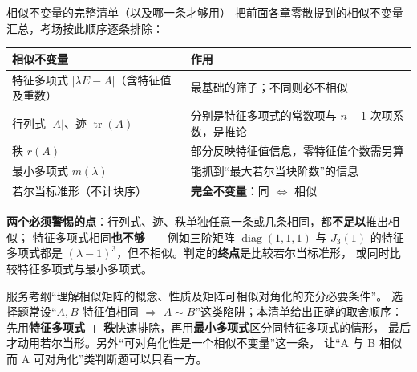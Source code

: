 
\begin{fdeep}{相似不变量的完整清单（以及哪一条才够用）}
把前面各章零散提到的相似不变量汇总，考场按此顺序逐条排除：
\begin{center}
\begin{tabular}{@{}ll@{}}
\textbf{相似不变量} & \textbf{作用} \\
\hline
特征多项式 $|\lambda E-A|$（含特征值及重数） & 最基础的筛子；不同则必不相似 \\
行列式 $|A|$、迹 $\operatorname{tr}(A)$ & 分别是特征多项式的常数项与 $n-1$ 次项系数，是推论 \\
秩 $r(A)$ & 部分反映特征值信息，零特征值个数需另算 \\
最小多项式 $m(\lambda)$ & 能抓到“最大若尔当块阶数”的信息 \\
若尔当标准形（不计块序） & \textbf{完全不变量}：同 $\iff$ 相似 \\
\end{tabular}
\end{center}
\textbf{两个必须警惕的点}：行列式、迹、秩单独任意一条或几条相同，都\textbf{不足以}推出相似；
特征多项式相同\textbf{也不够}——例如三阶矩阵 $\operatorname{diag}(1,1,1)$ 与 $J_3(1)$ 的特征
多项式都是 $(\lambda-1)^3$，但不相似。判定的\textbf{终点}是比较若尔当标准形，
或同时比较特征多项式与最小多项式。

\fbref{}服务考纲“理解相似矩阵的概念、性质及矩阵可相似对角化的充分必要条件”。
选择题常设“$A,B$ 特征值相同 $\Rightarrow$ $A\sim B$”这类陷阱；本清单给出正确的取舍顺序：
先用\textbf{特征多项式 + 秩}快速排除，再用\textbf{最小多项式}区分同特征多项式的情形，
最后才动用若尔当形。另外“可对角化性是一个相似不变量”这一条，
让“A 与 B 相似而 A 可对角化”类判断题可以只看一方。
\end{fdeep}

